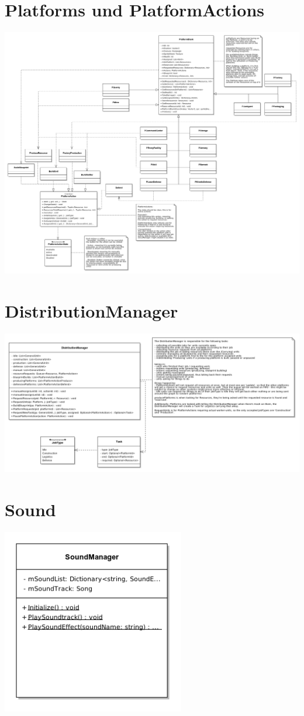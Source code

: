 \documentclass[12pt]{article}
\begin{document}
\section{Platforms und PlatformActions}
\includegraphics[width=\textwidth]{Platforms}
\newline

\section{DistributionManager}
\includegraphics[width=\textwidth]{DistributionManager}
\newline

\section{Sound}
\includegraphics[width=0.6\textwidth]{Sound}
\newline
\end{document}
